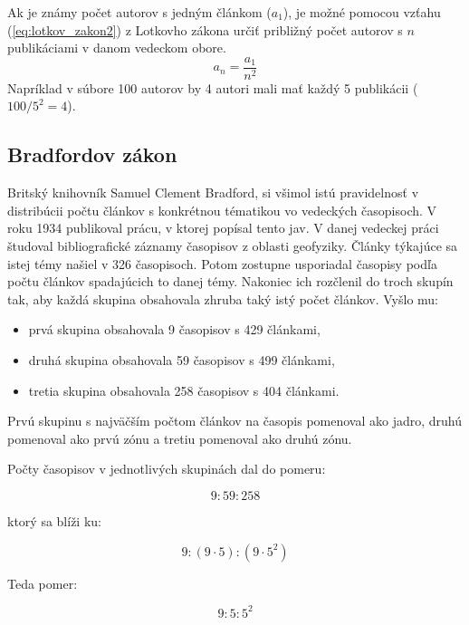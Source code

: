 Ak je známy počet autorov s jedným článkom ($a_1$), je možné pomocou vzťahu
(\ref{eq:lotkov_zakon2}) z Lotkovho zákona určiť približný počet autorov s $n$
publikáciami v danom vedeckom obore.
\begin{equation}
\label{eq:lotkov_zakon2}
a_n = \frac{a_1}{n^2}
\end{equation}
Napríklad v súbore 100 autorov by 4 autori mali mať každý 5 publikácii
($100/5^2 = 4$).


\subsection{Bradfordov zákon}

Britský knihovník Samuel Clement Bradford, si všimol istú pravidelnosť v
distribúcii počtu článkov s konkrétnou tématikou vo vedeckých časopisoch.  V
roku 1934 publikoval prácu, v ktorej popísal tento jav.  V danej vedeckej práci
študoval bibliografické záznamy časopisov z oblasti geofyziky.  Články týkajúce
sa istej témy našiel v 326 časopisoch.  Potom zostupne usporiadal časopisy podľa
počtu článkov spadajúcich to danej témy.  Nakoniec ich rozčlenil do troch skupín
tak, aby každá skupina obsahovala zhruba taký istý počet článkov.  Vyšlo mu:

\begin{itemize}
\item prvá skupina obsahovala 9 časopisov s 429 článkami,
\item druhá skupina obsahovala 59 časopisov s 499 článkami,
\item tretia skupina obsahovala 258 časopisov s 404 článkami.
\end{itemize}

Prvú skupinu s najväčším počtom článkov na časopis pomenoval ako jadro, druhú
pomenoval ako prvú zónu a tretiu pomenoval ako druhú zónu.

Počty časopisov v jednotlivých skupinách dal do pomeru:

\begin{equation}
\label{eq:bradfordov_zakon1}
9 : 59 : 258
\end{equation}

ktorý sa blíži ku:

\begin{equation}
\label{eq:bradfordov_zakon2}
9 : (9 \cdot 5) : (9 \cdot 5^2)
\end{equation}

Teda pomer:

\begin{equation}
\label{eq:bradfordov_zakon3}
9 : 5 : 5^2
\end{equation}

